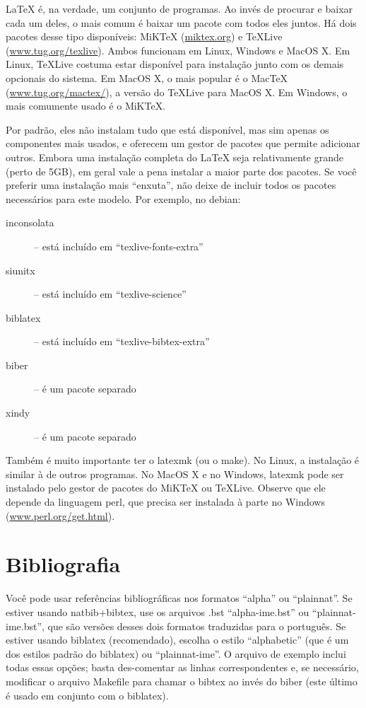 \LaTeX{} é, na verdade, um conjunto de programas. Ao invés de procurar e
baixar cada um deles, o mais comum é baixar um pacote com todos eles juntos.
Há dois pacotes desse tipo disponíveis: MiK\TeX{} (\url{miktex.org}) e
\TeX{}Live (\url{www.tug.org/texlive}). Ambos funcionam em Linux, Windows e
MacOS X. Em Linux, \TeX{}Live costuma estar disponível para instalação junto
com os demais opcionais do sistema. Em MacOS X, o mais popular é o Mac\TeX{}
(\url{www.tug.org/mactex/}), a versão do \TeX{}Live para MacOS X.  Em Windows,
o mais comumente usado é o MiK\TeX{}.

Por padrão, eles não instalam tudo que está disponível, mas sim apenas os
componentes mais usados, e oferecem um gestor de pacotes que permite adicionar
outros. Embora uma instalação completa do \LaTeX{} seja relativamente grande
(perto de 5GB), em geral vale a pena instalar a maior parte dos pacotes. Se
você preferir uma instalação mais ``enxuta'', não deixe de incluir todos os
pacotes necessários para este modelo. Por exemplo, no debian:

\begin{description}
  \item [inconsolata] -- está incluído em ``texlive-fonts-extra''
  \item [siunitx] -- está incluído em ``texlive-science''
  \item [biblatex] -- está incluído em ``texlive-bibtex-extra''
  \item [biber] -- é um pacote separado
  \item [xindy] -- é um pacote separado
\end{description}

Também é muito importante ter o \textsf{latexmk} (ou o \textsf{make}). No Linux,
a instalação é similar à de outros programas. No MacOS X e no Windows,
\textsf{latexmk} pode ser instalado pelo gestor de pacotes do MiK\TeX{} ou
\TeX{}Live. Observe que ele depende da linguagem \textsf{perl}, que precisa ser
instalada à parte no Windows (\url{www.perl.org/get.html}).

\section{Bibliografia}

Você pode usar referências bibliográficas nos formatos ``alpha'' ou ``plainnat''.
Se estiver usando natbib+bibtex, use os arquivos .bst
``alpha-ime.bst'' ou ``plainnat-ime.bst'', que são versões desses dois formatos
traduzidas para o português. Se estiver usando biblatex
(recomendado), escolha o estilo ``alphabetic'' (que é um dos estilos padrão do
biblatex) ou ``plainnat-ime''. O arquivo de exemplo inclui todas essas opções;
basta des-comentar as linhas correspondentes e, se necessário, modificar o
arquivo Makefile para chamar o bibtex ao invés do
biber (este último é usado em conjunto com o biblatex).

